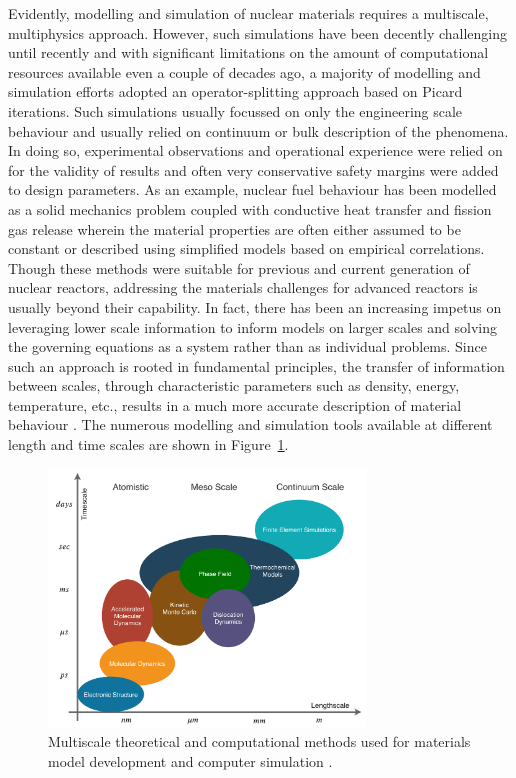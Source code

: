	 Evidently, modelling and simulation of nuclear materials requires a multiscale, multiphysics approach. However, such simulations have been decently challenging until recently and with significant limitations on the amount of computational resources available even a couple of decades ago, a majority of modelling and simulation efforts adopted an operator-splitting approach based on Picard iterations. Such simulations usually focussed on only the engineering scale behaviour and usually relied on continuum or bulk description of the phenomena. In doing so, experimental observations and operational experience were relied on for the validity of results and often very conservative safety margins were added to design parameters. As an example, nuclear fuel behaviour has been modelled as a solid mechanics problem coupled with conductive heat transfer and fission gas release wherein the material properties are often either assumed to be constant or described using simplified models based on empirical correlations. Though these methods were suitable for previous and current generation of nuclear reactors, addressing the materials challenges for advanced reactors is usually beyond their capability. In fact, there has been an increasing impetus on leveraging lower scale information to inform models on larger scales and solving the governing equations as a system rather than as individual problems.  Since such an approach is rooted in fundamental principles, the transfer of information between scales, through characteristic parameters such as density, energy, temperature, etc., results in a much more accurate description of material behaviour \cite{STAN200920}. The numerous modelling and simulation tools available at different length and time scales are shown in Figure~\ref{fig:multiphys}.
	\begin{figure}[htb]
		\centering
		\includegraphics[width=0.75\textwidth]{figures/chapter-1/Multiphysics.pdf}
		\caption[Multiscale methods used for materials modelling simulation]{Multiscale theoretical and computational methods used for materials model development and computer simulation \cite{STAN200920}.}
		\label{fig:multiphys}
	\end{figure}
	
